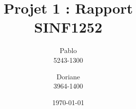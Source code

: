 \title{Projet 1 : Rapport\\ \small{SINF1252}}
\author{Pablo \\5243-1300 \and Doriane  \\3964-1400}
\date{\today}
